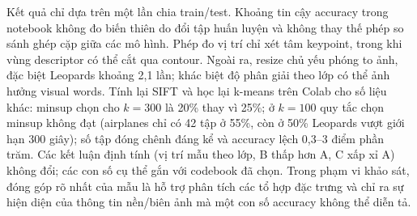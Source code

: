 Kết quả chỉ dựa trên một lần chia train/test. Khoảng tin cậy accuracy trong notebook không đo biến thiên
do đổi tập huấn luyện và không thay thế phép so sánh ghép cặp giữa các mô hình. Phép đo vị trí chỉ xét
tâm keypoint, trong khi vùng descriptor có thể cắt qua contour. Ngoài ra, resize chủ yếu phóng to ảnh,
đặc biệt Leopards khoảng 2,1 lần; khác biệt độ phân giải theo lớp có thể ảnh hưởng visual words.
Tính lại SIFT và học lại k-means trên Colab cho số liệu khác: minsup chọn cho $k=300$ là 20\% thay vì 25\%; ở $k=100$ quy tắc chọn
minsup không đạt (airplanes chỉ có 42 tập ở 55\%, còn ở 50\% Leopards vượt giới hạn 300 giây); số tập đóng chênh
đáng kể và accuracy lệch 0,3--3 điểm phần trăm. Các kết luận định tính (vị trí mẫu theo lớp, B thấp hơn A, C xấp xỉ
A) không đổi; các con số cụ thể gắn với codebook đã chọn.
Trong phạm vi khảo sát, đóng góp rõ nhất của mẫu là hỗ trợ phân tích các tổ hợp đặc trưng và chỉ ra
sự hiện diện của thông tin nền/biên ảnh mà một con số accuracy không thể diễn tả.
